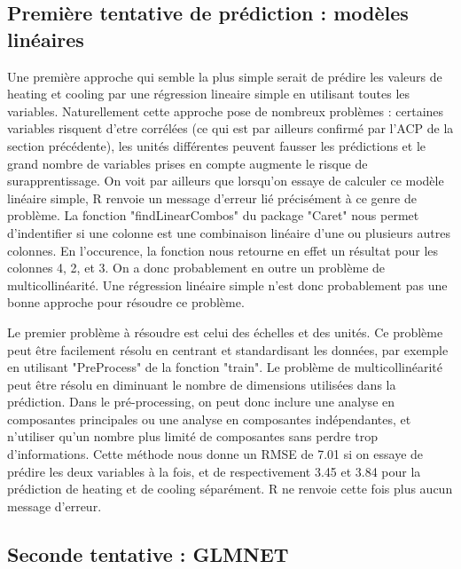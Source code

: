 \documentclass[11pt,a4paper]{article}
\begin{document}
\subsection{Première tentative de prédiction : modèles linéaires}

Une première approche qui semble la plus simple serait de prédire les valeurs de heating et cooling par une régression lineaire simple en utilisant toutes les variables. Naturellement cette approche pose de nombreux problèmes : certaines variables risquent d'etre corrélées (ce qui est par ailleurs confirmé par l'ACP de la section précédente), les unités différentes peuvent fausser les prédictions et le grand nombre de variables prises en compte augmente le risque de surapprentissage. On voit par ailleurs que lorsqu'on essaye de calculer ce modèle linéaire simple, R renvoie un message d'erreur lié précisément à ce genre de problème. La fonction "findLinearCombos" du package "Caret" nous permet d'indentifier si une colonne est une combinaison linéaire d'une ou plusieurs autres colonnes. En l'occurence, la fonction nous retourne en effet un résultat pour les colonnes 4, 2, et 3. On a donc probablement en outre un problème de multicollinéarité. Une régression linéaire simple n'est donc probablement pas une bonne approche pour résoudre ce problème. \bigskip

Le premier problème à résoudre est celui des échelles et des unités. Ce problème peut être facilement résolu en centrant et standardisant les données, par exemple en utilisant "PreProcess" de la fonction "train". Le problème de multicollinéarité peut être résolu en diminuant le nombre de dimensions utilisées dans la prédiction. Dans le pré-processing, on peut donc inclure une analyse en composantes principales ou une analyse en composantes indépendantes, et n'utiliser qu'un nombre plus limité de composantes sans perdre trop d'informations. Cette méthode nous donne un RMSE de 7.01 si on essaye de prédire les deux variables à la fois, et de respectivement 3.45 et 3.84 pour la prédiction de heating et de cooling séparément. R ne renvoie cette fois plus aucun message d'erreur.

\subsection{Seconde tentative : GLMNET}
\end{document}
